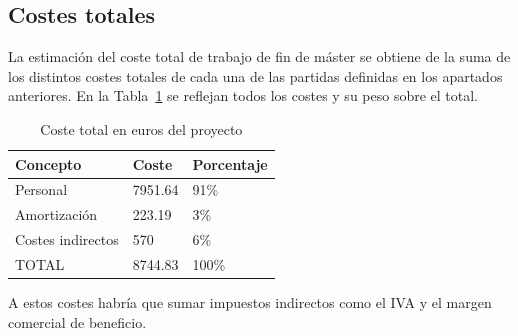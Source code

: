 \subsection{Costes totales}

La estimación del coste total de trabajo de fin de máster se obtiene de la suma de los distintos costes totales de cada una de las partidas definidas en los apartados anteriores.
En la Tabla~\ref{tab:coste-total} se reflejan todos los costes y su peso sobre el total.

\begin{table}[H]
    \centering
    \begin{tabular}{lll}
        \toprule
        Concepto          & Coste   & Porcentaje \\
        \midrule
        Personal          & 7951.64 & 91\%       \\
        Amortización      & 223.19  & 3\%        \\
        Costes indirectos & 570     & 6\%        \\
        \midrule
        TOTAL             & 8744.83 & 100\%      \\
        \bottomrule
    \end{tabular}
    \caption{Coste total en euros del proyecto}
    \label{tab:coste-total}
\end{table}

A estos costes habría que sumar impuestos indirectos como el IVA y el margen comercial de beneficio.